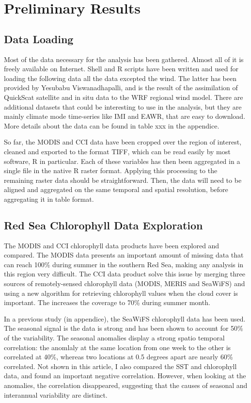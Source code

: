 \chapter{Preliminary Results}

\section{Data Loading}

Most of the data necessary for the analysis has been gathered. Almost all of it
is freely available on Internet. Shell and R scripts have been written and used
for loading the following data all the data excepted the wind. The latter has
been provided by Yesubabu Viswanadhapalli, and is the result of the
assimilation of QuickScat satellite and in situ data to the WRF regional wind
model. There are additional datasets that could be interesting to use in the
analysis, but they are mainly climate mode time-series like IMI and EAWR, that
are easy to download. More details about the data can be found in table xxx in
the appendice.

So far, the MODIS and CCI data have been cropped over the region of interest,
cleaned and exported to the format TIFF, which can be read easily by most
software, R in particular. Each of these variables has then been aggregated in
a single file in the native R raster format. Applying this processing to the
remaining raster data should be straightforward. Then, the data will need to be
aligned and aggregated on the same temporal and spatial resolution, before
aggregating it in table format.

\section{Red Sea Chlorophyll Data Exploration}

The MODIS and CCI chlorophyll data products have been explored and compared.
The MODIS data presents an important amount of missing data that can reach
100\% during summer in the southern Red Sea, making any analysis in this region
very difficult. The CCI data product solve this issue by merging three sources
of remotely-sensed chlorophyll data (MODIS, MERIS and SeaWiFS) and using a new
algorithm for retrieving chlorophyll values when the cloud cover is important.
The increases the coverage to 70\% during summer month.

In a previous study (in appendice), the SeaWiFS chlorophyll data has been used.
The seasonal signal is the data is strong and has been shown to account for
50\% of the variability. The seasonal anomalies display a strong spatio
temporal correlation: the anomlaly at the same location from one week to the
other is correlated at 40\%, whereas two locations at 0.5 degrees apart are
nearly 60\% correlated. Not shown in this article, I also compared the SST and
chlorophyll data, and found an important negative correlation. However, when
looking at the anomalies, the correlation disappeared, suggesting that the
causes of seasonal and interannual variability are distinct.

